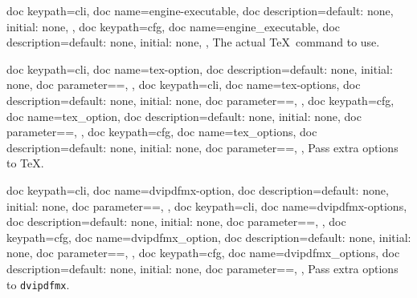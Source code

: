 \documentclass[a4paper, 11pt]{scrartcl}
\let\TeXold\TeX
\renewcommand\TeX{\TeXold\xspace}
\begin{document}
\begin{docKeys}[
		doc parameter={=\meta{engine\_executable}},
	]{
		{
			doc keypath=cli,
			doc name=engine-executable,
			doc description={default: none, initial: none},
		},
		{
			doc keypath=cfg,
			doc name=engine_executable,
			doc description={default: none, initial: none},
		},
	}
	The actual \TeX\ command to use.
\end{docKeys}
\begin{docKeys}{
		{
			doc keypath=cli,
			doc name=tex-option,
			doc description={default: none, initial: none},
			doc parameter={=},
		},
		{
			doc keypath=cli,
			doc name=tex-options,
			doc description={default: none, initial: none},
			doc parameter={=},
		},
		{
			doc keypath=cfg,
			doc name=tex_option,
			doc description={default: none, initial: none},
			doc parameter={=},
		},
		{
			doc keypath=cfg,
			doc name=tex_options,
			doc description={default: none, initial: none},
			doc parameter={=},
		},
	}
	Pass extra options to \TeX.
\end{docKeys}
\begin{docKeys}{
		{
			doc keypath=cli,
			doc name=dvipdfmx-option,
			doc description={default: none, initial: none},
			doc parameter={=},
		},
		{
			doc keypath=cli,
			doc name=dvipdfmx-options,
			doc description={default: none, initial: none},
			doc parameter={=},
		},
		{
			doc keypath=cfg,
			doc name=dvipdfmx_option,
			doc description={default: none, initial: none},
			doc parameter={=},
		},
		{
			doc keypath=cfg,
			doc name=dvipdfmx_options,
			doc description={default: none, initial: none},
			doc parameter={=},
		},
	}
	Pass extra options to \texttt{dvipdfmx}.
\end{docKeys}
\end{document}
